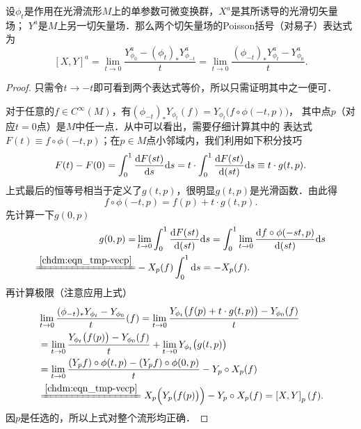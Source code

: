 \begin{theorem}\label{chdm:thm_xy-yx}
    设$\phi_t$是作用在光滑流形$M$上的单参数可微变换群，$X^a$是其所诱导的光滑切矢量场；
    $Y^a$是$M$上另一切矢量场．那么两个切矢量场的Poisson括号（对易子）表达式为
    \begin{equation}\label{chdm:eqn_xy-yx}
        \left[X,Y\right]^a = \lim_{t\to 0} \frac{Y^a_{\phi_{0}} - (\phi_{t})_{*} Y^a_{\phi_{-t}} }{t}
        =\lim_{t\to 0} \frac{(\phi_{-t})_{*} Y^a_{\phi_{t}} - Y^a_{\phi_{0}}}{t} .
    \end{equation}
\end{theorem}
\begin{proof}
    只需令$t\to -t$即可看到两个表达式等价，所以只需证明其中之一便可．
    
    对于任意的$f\in C^\infty(M)$，有$(\phi_{-t})_{*} Y_{\phi_{t}}(f)=Y_{\phi_{t}}\bigl( f\circ\phi({-t},p) \bigr)$，
    其中点$p$（对应$t=0$点）是$M$中任一点．从中可以看出，需要仔细计算其中的
    表达式$F(t)\equiv f\circ\phi({-t},p)$；在$p\in M$点小邻域内，我们利用如下积分技巧
    \begin{equation*}
        F(t)-F(0) = \int_{0}^{1} \frac{{\rm d} F(st)}{{\rm d} s} {\rm d}s
        = t \cdot \int_{0}^{1}  \frac{{\rm d} F(st)}{{\rm d} (st)} {\rm d}s 
        \equiv t \cdot g(t,p).
    \end{equation*}
    上式最后的恒等号相当于定义了$g(t,p)$，很明显$g(t,p)$是光滑函数．由此得
    \begin{equation}
        f\circ\phi({-t},p) = f(p) + t \cdot g(t,p) .
    \end{equation}
    先计算一下$g(0,p)$
    \begin{align*}
        g(0,p)=& \lim_{t\to 0} \int_{0}^{1}  \frac{{\rm d} F(st)}{{\rm d} (st)} {\rm d}s
        = \int_{0}^{1} \lim_{t\to 0} \frac{{\rm d} f\circ\phi({-st},p)}{{\rm d} (st)} {\rm d}s \\
        \xlongequal{\ref{chdm:eqn_tmp-vecp}} &
        - X_{p}(f) \int_{0}^{1}  {\rm d}s = -X_{p}(f) .
    \end{align*}
    再计算极限（注意应用上式）
    \begin{align*}
        &\lim_{t\to 0} \frac{(\phi_{-t})_{*} Y_{\phi_{t}} - Y_{\phi_{0}}}{t}(f) =
        \lim_{t\to 0} \frac{Y_{\phi_{t}}\bigl( f(p) + t \cdot g(t,p) \bigr) - Y_{\phi_{0}}(f)}{t}  \\
        &= \lim_{t\to 0} \frac{Y_{\phi_{t}}\bigl( f(p)  \bigr) - Y_{\phi_{0}}(f)}{t} 
          + \lim_{t\to 0} Y_{\phi_{t}}\bigl(  g(t,p) \bigr) \\
        &=\lim_{t\to 0} \frac{(Y_{p} f) \circ\phi(t,p)  - (Y_{p}f )\circ\phi(0,p) }{t} - Y_{p} \circ X_{p}(f) \\
        & \xlongequal{\ref{chdm:eqn_tmp-vecp}} 
        X_{p}\Bigl(Y_{p}\bigl( f (p) \bigr)\Bigr) - Y_{p} \circ X_{p}(f)
        =\left[X,Y\right]_p (f) .
    \end{align*}
    因$p$是任选的，所以上式对整个流形均正确．
\end{proof}


